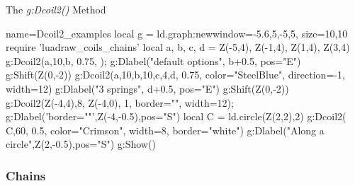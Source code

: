 \begin{itemize}
\begin{demo}{The \emph{g:Dcoil2()} Method}
\begin{luadraw}{name=Dcoil2_examples}
local g = ld.graph:new{window={-5.6,5,-5,5}, size={10,10}}
require 'luadraw_coils_chains'
local a, b, c, d = Z(-5,4), Z(-1,4), Z(1,4), Z(3,4)
g:Dcoil2({a,10,b}, 0.75, {}); g:Dlabel("default options", b+0.5, {pos="E"})
g:Shift(Z(0,-2))
g:Dcoil2({a,10,b,10,c,4,d}, 0.75, {color="SteelBlue", direction=-1, width=12})
g:Dlabel("3 springs", d+0.5, {pos="E"})
g:Shift(Z(0,-2))
g:Dcoil2({Z(-4,4),8, Z(-4,0)}, 1, {border="", width=12}); g:Dlabel('border=""',Z(-4,-0.5),{pos="S"})
local C = ld.circle(Z(2,2),2)
g:Dcoil2( {C,60}, 0.5, {color="Crimson", width=8, border="white"})
g:Dlabel("Along a circle",Z(2,-0.5),{pos="S"})
g:Show()
\end{luadraw}  
\end{demo}        
\end{itemize}

\subsubsection{Chains}

